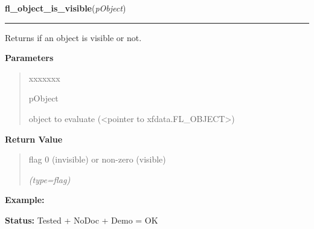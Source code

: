 \hspace{.8\funcindent}\begin{boxedminipage}{\funcwidth}

    \raggedright \textbf{fl\_object\_is\_visible}(\textit{pObject})

    \vspace{-1.5ex}

    \rule{\textwidth}{0.5\fboxrule}
\setlength{\parskip}{2ex}
    Returns if an object is visible or not.

\setlength{\parskip}{1ex}
      \textbf{Parameters}
      \vspace{-1ex}

      \begin{quote}
        \begin{Ventry}{xxxxxxx}

          \item[pObject]

          object to evaluate ({\textless}pointer to 
          xfdata.FL\_OBJECT{\textgreater})

        \end{Ventry}

      \end{quote}

      \textbf{Return Value}
    \vspace{-1ex}

      \begin{quote}
      flag 0 (invisible) or non-zero (visible)

      {\it (type=flag)}

      \end{quote}

\textbf{Example:} 

\textbf{Status:} Tested + NoDoc + Demo = OK



    \end{boxedminipage}

    \label{xformslib:library:fl_free_object}

    \vspace{0.5ex}

